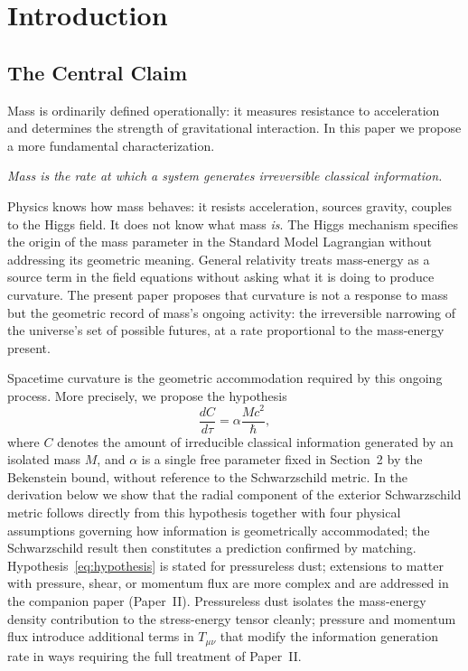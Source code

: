 \documentclass[12pt]{article}
\begin{document}
\section{Introduction}

\subsection{The Central Claim}

Mass is ordinarily defined operationally: it measures resistance to
acceleration and determines the strength of gravitational interaction.
In this paper we propose a more fundamental characterization.

\emph{Mass is the rate at which a system generates irreversible classical
information.}

Physics knows how mass behaves: it resists acceleration, sources
gravity, couples to the Higgs field.
It does not know what mass \emph{is}.
The Higgs mechanism specifies the origin of the mass parameter in the
Standard Model Lagrangian without addressing its geometric meaning.
General relativity treats mass-energy as a source term in the field
equations without asking what it is doing to produce curvature.
The present paper proposes that curvature is not a response to mass but
the geometric record of mass's ongoing activity: the irreversible
narrowing of the universe's set of possible futures, at a rate
proportional to the mass-energy present.

Spacetime curvature is the geometric accommodation required by this
ongoing process. More precisely, we propose the hypothesis
\begin{equation}
  \frac{dC}{d\tau} = \alpha \frac{Mc^2}{\hbar},
  \label{eq:hypothesis}
\end{equation}
where $C$ denotes the amount of irreducible classical information
generated by an isolated mass $M$, and $\alpha$ is a single free
parameter fixed in Section~2 by the Bekenstein bound, without reference
to the Schwarzschild metric.
In the derivation below we show that the radial component of the exterior
Schwarzschild metric follows directly from this hypothesis together with
four physical assumptions governing how information is geometrically
accommodated; the Schwarzschild result then constitutes a prediction
confirmed by matching.
Hypothesis~\eqref{eq:hypothesis} is stated for pressureless dust;
extensions to matter with pressure, shear, or momentum flux are more
complex and are addressed in the companion paper (Paper~II).
Pressureless dust isolates the mass-energy density contribution to the
stress-energy tensor cleanly; pressure and momentum flux introduce
additional terms in $T_{\mu\nu}$ that modify the information generation
rate in ways requiring the full treatment of Paper~II.
\end{document}
